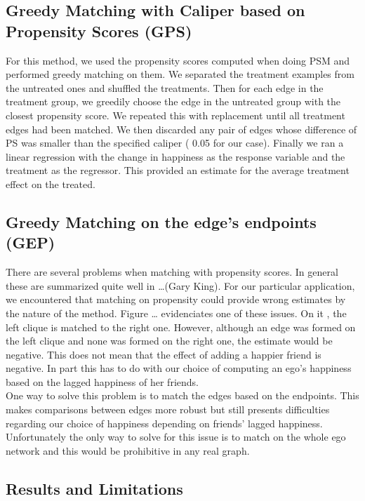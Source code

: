\documentclass[11pt]{article}
\begin{document}
\subsection{Greedy Matching with Caliper based on Propensity Scores (GPS)}
For this method, we used the propensity scores computed when doing PSM and performed greedy matching on them. We separated the treatment examples from the untreated ones and shuffled the treatments. Then for each edge in the treatment group, we greedily choose the edge in the untreated group with the closest propensity score. We repeated this with replacement until all treatment edges had been matched. We then discarded any pair of edges whose difference of PS was smaller than the specified caliper ( 0.05 for our case). Finally we ran a linear regression with the change in happiness as the response variable and the treatment as the regressor. This provided an estimate for the average treatment effect on the treated.

\subsection{Greedy Matching on the edge's endpoints (GEP)}

There are several problems when matching with propensity scores. In general these are summarized quite well in …(Gary King). For our particular application, we encountered that matching on propensity could provide wrong estimates by the nature of the method. Figure … evidenciates one of these issues. On it , the left clique is matched to the right one. However, although an edge was formed on the left clique and none was formed on the right one, the estimate would be negative. This does not mean that the effect of adding a happier friend is negative. In part this has to do with our choice of computing an ego’s happiness based on the lagged happiness of her friends.\\

One way to solve this problem is to match the edges based on the endpoints. This makes comparisons between edges more robust but still presents difficulties regarding our choice of happiness depending on friends' lagged happiness. Unfortunately the only way to solve for this issue is to match on the whole ego network and this would be prohibitive in any real graph.


\subsection{Results and Limitations}
\end{document}
